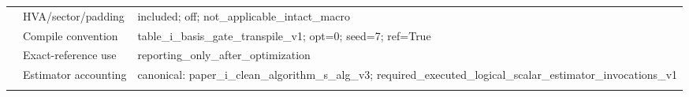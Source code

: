 \documentclass[10pt,letterpaper]{article}
\begin{document}
\begin{longtable}{@{}>{\raggedright\arraybackslash}p{0.9in}>{\raggedright\arraybackslash}p{1.65in}>{\raggedright\arraybackslash}p{4.7in}@{}}
 & HVA/sector/padding & included;\allowbreak{} off;\allowbreak{} not\_\allowbreak{}applicable\_\allowbreak{}intact\_\allowbreak{}macro \\
 & Compile convention & table\_\allowbreak{}i\_\allowbreak{}basis\_\allowbreak{}gate\_\allowbreak{}transpile\_\allowbreak{}v1;\allowbreak{} opt=0;\allowbreak{} seed=7;\allowbreak{} ref=True \\
 & Exact-reference use & reporting\_\allowbreak{}only\_\allowbreak{}after\_\allowbreak{}optimization \\
 & Estimator accounting & canonical:\allowbreak{} paper\_\allowbreak{}i\_\allowbreak{}clean\_\allowbreak{}algorithm\_\allowbreak{}s\_\allowbreak{}alg\_\allowbreak{}v3;\allowbreak{} required\_\allowbreak{}executed\_\allowbreak{}logical\_\allowbreak{}scalar\_\allowbreak{}estimator\_\allowbreak{}invocations\_\allowbreak{}v1 \\
\addlinespace[2pt]
\bottomrule
\end{longtable}
\end{document}
